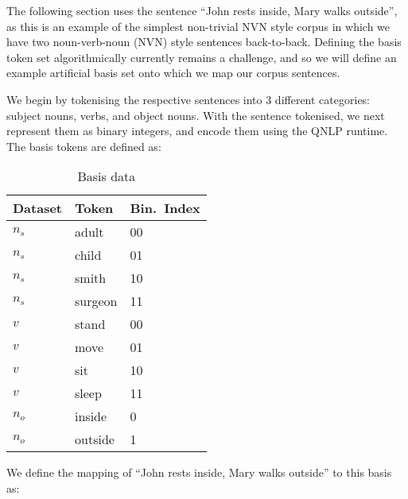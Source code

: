 The following section uses the sentence ``John rests inside, Mary walks outside'', as this is an example of the simplest non-trivial NVN style corpus in which we have two noun-verb-noun (NVN) style sentences back-to-back. Defining the basis token set algorithmically currently remains a challenge, and so we will define an example artificial basis set onto which we map our corpus sentences. 

We begin by tokenising the respective sentences into 3 different categories: subject nouns, verbs, and object nouns. With the sentence tokenised, we next represent them as binary integers, and encode them using the QNLP runtime. The basis tokens are defined as:

\begin{table}[h!]
    \centering
    \begin{tabular}{ |p{3cm}|p{3cm}|p{3cm}| }
        \textbf{Dataset} & \textbf{Token} & \textbf{Bin.~Index}\\
        \hline
        {$n_s$} & {adult} & 00 \\
        {$n_s$} & {child} & 01 \\
        {$n_s$} & {smith} & 10 \\
        {$n_s$} & {surgeon} & 11 \\
        \hline
        {$v$} & {stand} & 00 \\
        {$v$} & {move} & 01 \\
        {$v$} & {sit} & 10 \\
        {$v$} & {sleep} & 11 \\
        \hline
        {$n_o$} & {inside} & 0 \\
        {$n_o$} & {outside} & 1 \\
        \hline
    \end{tabular}
    \caption{Basis data}
    \label{tbl:basis_encoding}
\end{table}

We define the mapping of ``John rests inside, Mary walks outside'' to this basis as:

